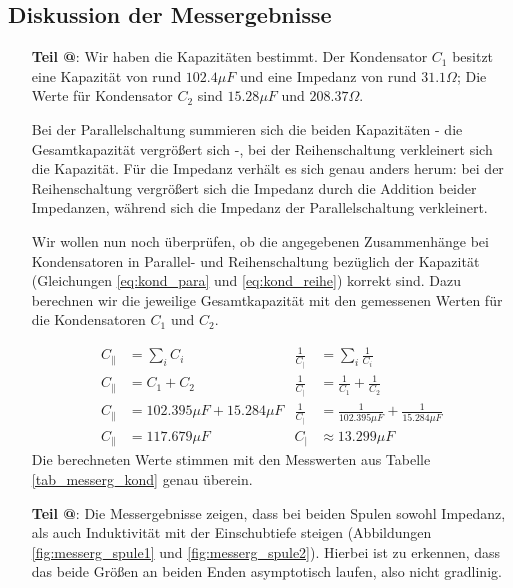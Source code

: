 \documentclass[10pt,a4paper]{article}
\makeatletter
\newcommand*{\rom}[1]{\expandafter\@slowromancap\romannumeral #1@}
\makeatother
\begin{document}
\subsection{Diskussion der Messergebnisse}
\begin{flushleft}
\begin{itemize}
\item[\textbf{Teil \rom{1}}:] Wir haben die Kapazitäten bestimmt. Der Kondensator $C_1$ besitzt eine Kapazität von rund $102.4 \mu F$ und eine Impedanz von rund $31.1 \Omega$; Die Werte für Kondensator $C_2$ sind $15.28 \mu F$ und $208.37 \Omega$.

Bei der Parallelschaltung summieren sich die beiden Kapazitäten - die Gesamtkapazität vergrößert sich -, bei der Reihenschaltung verkleinert sich die Kapazität. Für die Impedanz verhält es sich genau anders herum: bei der Reihenschaltung vergrößert sich die Impedanz durch die Addition beider Impedanzen, während sich die Impedanz der Parallelschaltung verkleinert.

Wir wollen nun noch überprüfen, ob die angegebenen Zusammenhänge bei Kondensatoren in Parallel- und Reihenschaltung bezüglich der Kapazität (Gleichungen \ref{eq:kond_para} und \ref{eq:kond_reihe}) korrekt sind. Dazu berechnen wir die jeweilige Gesamtkapazität mit den gemessenen Werten für die Kondensatoren $C_1$ und $C_2$.

\begin{align*}
C_{\parallel} &= \sum_i C_i & \frac{1}{C_{\mid}} &= \sum_i \frac{1}{C_i} \\
C_{\parallel} &= C_1 + C_2 & \frac{1}{C_{\mid}} &= \frac{1}{C_1} + \frac{1}{C_2} \\
C_{\parallel} &= 102.395 \mu F + 15.284 \mu F & \frac{1}{C_{\mid}} &= \frac{1}{102.395 \mu F} + \frac{1}{15.284 \mu F} \\
C_{\parallel} &= 117.679 \mu F & C_{\mid} &\approx 13.299 \mu F
\end{align*}
Die berechneten Werte stimmen mit den Messwerten aus Tabelle \ref{tab_messerg_kond} genau überein.

\item[\textbf{Teil \rom{2}}:] Die Messergebnisse zeigen, dass bei beiden Spulen sowohl Impedanz, als auch Induktivität mit der Einschubtiefe steigen (Abbildungen \ref{fig:messerg_spule1} und \ref{fig:messerg_spule2}). Hierbei ist zu erkennen, dass das beide Größen an beiden \glqq Enden\grqq\hspace{1pt} asymptotisch laufen, also nicht gradlinig.


\end{itemize}
\end{flushleft}
\end{document}
